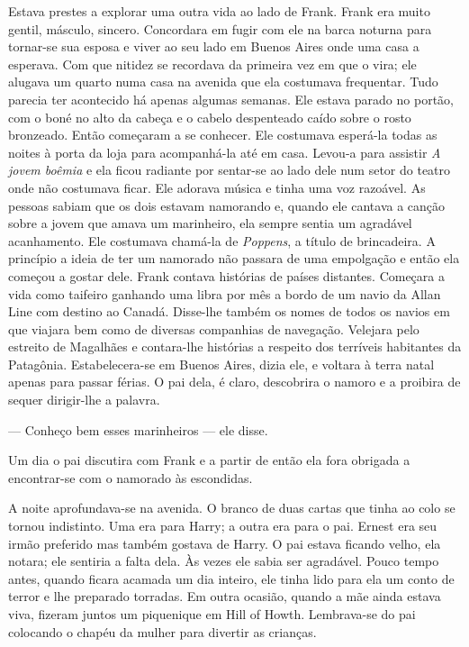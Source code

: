 Estava prestes a explorar uma outra vida ao lado de Frank.  Frank era muito
gentil, másculo, sincero.  Concordara em fugir com ele na barca noturna para
tornar-se sua esposa e viver ao seu lado em Buenos Aires onde uma casa a
esperava.  Com que nitidez se recordava da primeira vez em que o vira; ele
alugava um quarto numa casa na avenida que ela costumava frequentar.  Tudo
parecia ter acontecido há apenas algumas semanas.  Ele estava parado no portão,
com o boné no alto da cabeça e o cabelo despenteado caído sobre o rosto
bronzeado.  Então começaram a se conhecer.  Ele costumava esperá-la todas as
noites à porta da loja para acompanhá-la até em casa.  Levou-a para assistir
\textit{A jovem boêmia} e ela ficou radiante por sentar-se ao lado dele num
setor do teatro onde não costumava ficar.  Ele adorava música e tinha uma voz
razoável.  As pessoas sabiam que os dois estavam namorando e, quando ele
cantava a canção sobre a jovem que amava um marinheiro, ela sempre sentia um
agradável acanhamento.  Ele costumava chamá-la de \textit{Poppens}, a título
de brincadeira.  A princípio a ideia de ter um namorado não passara de uma
empolgação e então ela começou a gostar dele.  Frank contava histórias de
países distantes.  Começara a vida como taifeiro ganhando uma libra por mês a
bordo de um navio da Allan Line com destino ao Canadá.  Disse-lhe também os
nomes de todos os navios em que viajara bem como de diversas companhias de
navegação.  Velejara pelo estreito de Magalhães e contara-lhe histórias a
respeito dos terríveis habitantes da Patagônia.  Estabelecera-se em Buenos
Aires, dizia ele, e voltara à terra natal apenas para passar férias.  O pai
dela, é claro, descobrira o namoro e a proibira de sequer dirigir-lhe a
palavra.

--- Conheço bem esses marinheiros --- ele disse.

Um dia o pai discutira com Frank e a partir de então ela fora obrigada a
encontrar-se com o namorado às escondidas.

A noite aprofundava-se na avenida.  O branco de duas cartas que tinha ao colo
se tornou indistinto.  Uma era para Harry; a outra era para o pai.  Ernest era
seu irmão preferido mas também gostava de Harry.  O pai estava ficando velho,
ela notara; ele sentiria a falta dela.  Às vezes ele sabia ser agradável.
Pouco tempo antes, quando ficara acamada um dia inteiro, ele tinha lido para
ela um conto de terror e lhe preparado torradas.  Em outra ocasião, quando a
mãe ainda estava viva, fizeram juntos um piquenique em Hill of Howth.
Lembrava-se do pai colocando o chapéu da mulher para divertir as crianças.

